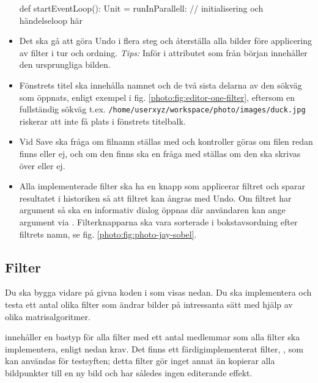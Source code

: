 \begin{itemize}
\begin{CodeSmall}
  def startEventLoop(): Unit = runInParallell:
    // initialisering och händelseloop här
\end{CodeSmall}

\item Det ska gå att göra Undo i flera steg och återställa alla bilder före applicering av filter i tur och ordning. \emph{Tips:} Inför i attributet  som från början innehåller den ursprungliga bilden.

\item Fönstrets titel ska innehålla namnet  och de två sista delarna av den sökväg  som öppnats, enligt exempel i fig. \ref{photo:fig:editor-one-filter}, eftersom en fullständig sökväg t.ex. \texttt{/home/userxyz/workspace/photo/images/duck.jpg} riskerar att inte få plats i fönstrets titelbalk.

\item Vid Save ska fråga om filnamn ställas med  och kontroller göras om filen redan finns eller ej, och om den finns ska en fråga med  ställas om den ska skrivas över eller ej.

\item Alla implementerade filter ska ha en knapp som applicerar filtret och sparar resultatet i historiken så att filtret kan ångras med Undo. Om filtret har argument så ska en informativ dialog öppnas där användaren kan ange argument via . Filterknapparna ska vara sorterade i bokstavsordning efter filtrets namn, se fig. \ref{photo:fig:photo-jay-sobel}.
\end{itemize}




\subsection{Filter}

Du ska bygga vidare på givna koden i  som visas nedan. Du ska implementera och testa ett antal olika filter som ändrar bilder på intressanta sätt med hjälp av olika matrisalgoritmer.


\noindent {} innehåller en bastyp för alla filter med ett antal medlemmar som alla filter ska implementera, enligt nedan krav. Det finns ett färdigimplementerat filter, , som kan användas för testsyften; detta filter gör inget annat än kopierar alla bildpunkter till en ny bild och har således ingen editerande effekt.

